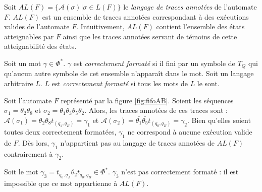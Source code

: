 Soit $AL(F)=\{\mathcal{A}(\sigma)|\sigma \in L(F)\}$ le \emph{langage de traces annotées} de l'automate $F$. $AL(F)$ est un ensemble de traces annotées correspondant à des exécutions valides de l'automate $F$. Intuitivement, $AL(F)$ contient l'ensemble des états atteignables par $F$ ainsi que les traces annotées servant de témoins de cette atteignabilité des états.


Soit un mot $\gamma \in \Phi^*$. $\gamma$ est \emph{correctement formaté} si il fini par un symbole de $T_Q$ qui qu'aucun autre symbole de cet ensemble n'apparaît dans le mot. Soit un langage arbitraire $L$. $L$ est \emph{correctement formaté} si tous les mots de $L$ le sont.


\begin{example}
Soit l'automate $F$ représenté par la figure \ref{fig:fifoAB}. Soient les séquences $\sigma_1=\theta_2\theta_8$ et $\sigma_2=\theta_1\theta_3\theta_5\theta_2$. Alors, les traces annotées de ces traces sont : $\mathcal{A}(\sigma_1)=\theta_2\theta_8t_{(q_1,q_B)}=\gamma_1$ et $\mathcal{A}(\sigma_2)=\bar{\theta_1}\bar{\theta_5}t_{(q_0,q_B)}=\gamma_2$.
Bien qu'elles soient toutes deux correctement formatées, $\gamma_1$ ne correspond à aucune exécution valide de $F$. Dès lors, $\gamma_1$ n'appartient pas au langage de traces annotées de $AL(F)$ contrairement à $\gamma_2$.

Soit le mot $\gamma_3=t_{q_0,q_A}\theta_2 t_{q_0,q_B} \in \Phi^*$. $\gamma_3$ n'est pas correctement formaté : il est impossible que ce mot appartienne à $AL(F)$.
\end{example}



